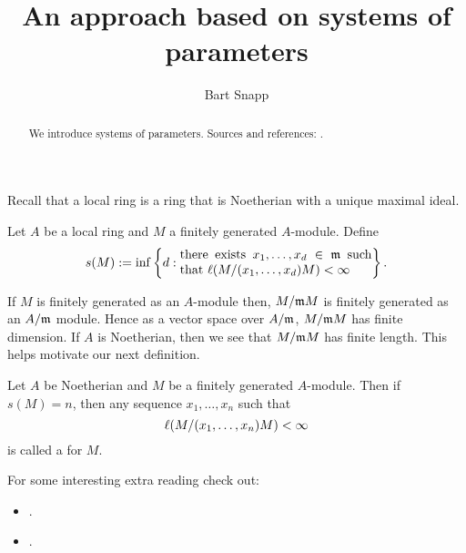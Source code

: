 \documentclass{ximera}
\author{Bart Snapp}
\title{An approach based on systems of parameters}
\begin{document}
\begin{abstract}
  We introduce systems of parameters. Sources and references:
  \cite{sD2008}.
\end{abstract}
\maketitle


Recall that a local ring is a ring that is Noetherian with a unique maximal ideal.

\begin{definition}
  Let $A$ be a local ring and $M$ a finitely generated $A$-module. Define
  \[
  s(M) := \inf\left\{d:
  \begin{minipage}{35ex}
    there exists $x_1,\dots, x_d\in \m$ such that $\l(M/(x_1,\dots,x_d)M)<\infty$
  \end{minipage} \right\}.
  \]
\end{definition}

If $M$ is finitely generated as an $A$-module then, $M/\mathfrak{m} M$ is
finitely generated as an $A/\mathfrak{m}$ module. Hence as a vector space over
$A/\mathfrak{m}$, $M/\mathfrak{m} M$ has finite dimension. If $A$ is Noetherian, then we
see that $M/\mathfrak{m} M$ has finite length. This helps motivate our next
definition.

\begin{definition}
  Let $A$ be Noetherian and $M$ be a finitely generated
  $A$-module. Then if $s(M) = n$, then any sequence $x_1,\dots, x_n$
  such that
  \[
  \l(M/(x_1,\dots,x_n)M)<\infty\index{finite length}
  \]
  is called a  for $M$. 
\end{definition}





For some interesting extra reading check out:
\begin{itemize}

\item {}.
\item {}.
\end{itemize}
\end{document}
